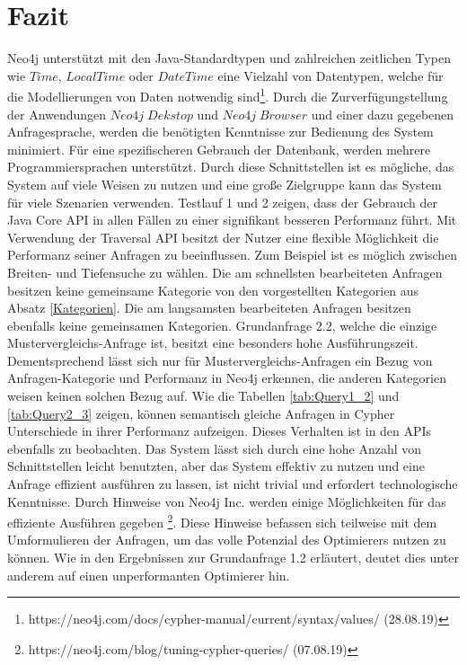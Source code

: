 \section{Fazit}
Neo4j unterstützt mit den Java-Standardtypen und zahlreichen zeitlichen Typen wie $Time$, $LocalTime$ oder $DateTime$ eine Vielzahl von Datentypen, welche für die Modellierungen von Daten notwendig sind\footnote{https://neo4j.com/docs/cypher-manual/current/syntax/values/ (28.08.19)}. Durch die Zurverfügungstellung der Anwendungen $Neo4j\; Dekstop$ und $Neo4j\; Browser$ und einer dazu gegebenen Anfragesprache, werden die benötigten Kenntnisse zur Bedienung des System minimiert. Für eine spezifischeren Gebrauch der Datenbank, werden mehrere Programmiersprachen unterstützt. Durch diese Schnittstellen ist es mögliche, das System auf viele Weisen zu nutzen und eine große Zielgruppe kann das System für viele Szenarien verwenden. \newline 
Testlauf 1 und 2 zeigen, dass der Gebrauch der Java Core API in allen Fällen zu einer signifikant besseren Performanz führt. Mit Verwendung der Traversal API besitzt der Nutzer eine flexible Möglichkeit die Performanz seiner Anfragen zu beeinflussen. Zum Beispiel ist es möglich zwischen Breiten- und Tiefensuche zu wählen. Die am schnellsten bearbeiteten Anfragen besitzen keine gemeinsame Kategorie von den vorgestellten Kategorien aus Absatz \ref{Kategorien}. Die am langsamsten bearbeiteten Anfragen besitzen ebenfalls keine gemeinsamen Kategorien. Grundanfrage 2.2, welche die einzige Mustervergleichs-Anfrage ist, besitzt eine besonders hohe Ausführungszeit. Dementsprechend lässt sich nur für Mustervergleichs-Anfragen ein Bezug von Anfragen-Kategorie und Performanz in Neo4j erkennen, die anderen Kategorien weisen keinen solchen Bezug auf. \newline
Wie die Tabellen \ref{tab:Query1_2} und \ref{tab:Query2_3} zeigen, können semantisch gleiche Anfragen in Cypher Unterschiede in ihrer Performanz aufzeigen. Dieses Verhalten ist in den APIs ebenfalls zu beobachten. Das System lässt sich durch eine hohe Anzahl von Schnittstellen leicht benutzten, aber das System effektiv zu nutzen und eine Anfrage effizient ausführen zu lassen, ist nicht trivial und erfordert technologische Kenntnisse. Durch Hinweise von Neo4j Inc. werden einige Möglichkeiten für das effiziente Ausführen gegeben \footnote{https://neo4j.com/blog/tuning-cypher-queries/ (07.08.19)}. Diese Hinweise befassen sich teilweise mit dem Umformulieren der Anfragen, um das volle Potenzial des Optimierers nutzen zu können. Wie in den Ergebnissen zur Grundanfrage 1.2 erläutert, deutet dies unter anderem auf einen unperformanten Optimierer hin. \newline

